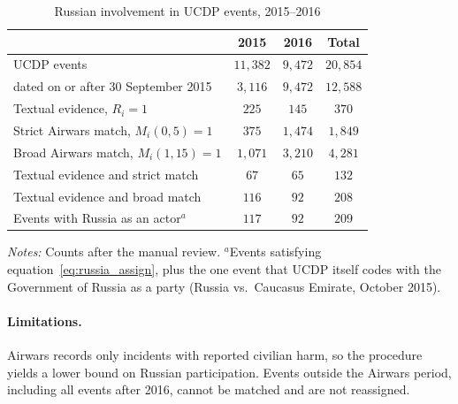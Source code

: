 \begin{table}[htbp]
\centering
\caption{Russian involvement in UCDP events, 2015--2016}
\label{tab:russia}
\begin{tabular}{lccc}
\hline\hline
 & 2015 & 2016 & Total \\
\hline
UCDP events                                     & $11{,}382$ & $9{,}472$ & $20{,}854$ \\
\quad dated on or after 30 September 2015       & $3{,}116$  & $9{,}472$ & $12{,}588$ \\
Textual evidence, $R_i=1$                       & $225$      & $145$     & $370$ \\
Strict Airwars match, $M_i(0,5)=1$              & $375$      & $1{,}474$ & $1{,}849$ \\
Broad Airwars match, $M_i(1,15)=1$              & $1{,}071$  & $3{,}210$ & $4{,}281$ \\
\hline
Textual evidence and strict match               & $67$       & $65$      & $132$ \\
Textual evidence and broad match                & $116$      & $92$      & $208$ \\
\hline
Events with Russia as an actor$^{a}$            & $117$      & $92$      & $209$ \\
\hline\hline
\end{tabular}

\vspace{0.5ex}
\begin{minipage}{0.9\linewidth}
\footnotesize
\emph{Notes:} Counts after the manual review. $^{a}$Events satisfying
equation~\eqref{eq:russia_assign}, plus the one event that UCDP itself codes
with the Government of Russia as a party (Russia vs.\ Caucasus Emirate,
October 2015).
\end{minipage}
\end{table}

\paragraph{Limitations.}
Airwars records only incidents with reported civilian harm, so the procedure
yields a lower bound on Russian participation. Events outside the Airwars
period, including all events after 2016, cannot be matched and are not
reassigned.
